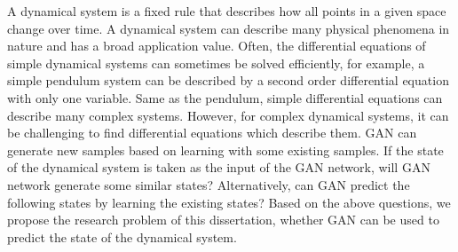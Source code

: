 \documentclass[11pt,a4paper]{article}
\begin{document}
A dynamical system is a fixed rule that describes how all points in a given space change over time. A dynamical system can describe many physical phenomena in nature and has a broad application value. Often, the differential equations of simple dynamical systems can sometimes be solved efficiently, for example, a simple pendulum system can be described by a second order differential equation with only one variable. Same as the pendulum, simple differential equations can describe many complex systems. However, for complex dynamical systems, it can be challenging to find differential equations which describe them. GAN can generate new samples based on learning with some existing samples. If the state of the dynamical system is taken as the input of the GAN network, will GAN network generate some similar states? Alternatively, can GAN predict the following states by learning the existing states? Based on the above questions, we propose the research problem of this dissertation, whether GAN can be used to predict the state of the dynamical system.
\\
\newline
\end{document}

